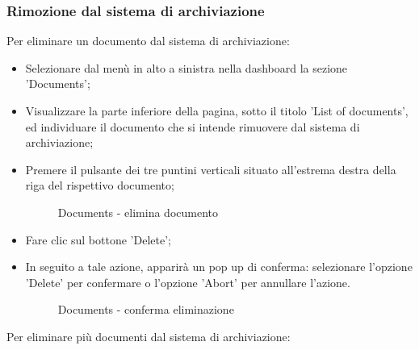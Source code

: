 \documentclass[10pt, a4paper]{article}
\begin{document}
\subsubsection{Rimozione dal sistema di archiviazione}

Per eliminare un documento dal sistema di archiviazione:
\begin{itemize}
    \item Selezionare dal menù in alto a sinistra nella dashboard la sezione 'Documents';
    \item Visualizzare la parte inferiore della pagina, sotto il titolo 'List of documents', ed individuare il documento che si intende rimuovere dal sistema di archiviazione;
    \item Premere il pulsante dei tre puntini verticali situato all'estrema destra della riga del rispettivo documento;
     \begin{figure}[H]
        \centering  
        \caption{Documents - elimina documento}
        \label{img:delDoc}
    \end{figure}
    \item Fare clic sul bottone 'Delete';
    \item In seguito a tale azione, apparirà un pop up di conferma: selezionare l'opzione 'Delete' per confermare o l'opzione 'Abort' per annullare l'azione.
    \begin{figure}[H]
        \centering  
        \caption{Documents - conferma eliminazione}
        \label{img:confirmdeldoc}
    \end{figure}
\end{itemize}
Per eliminare più documenti dal sistema di archiviazione:
\end{document}
